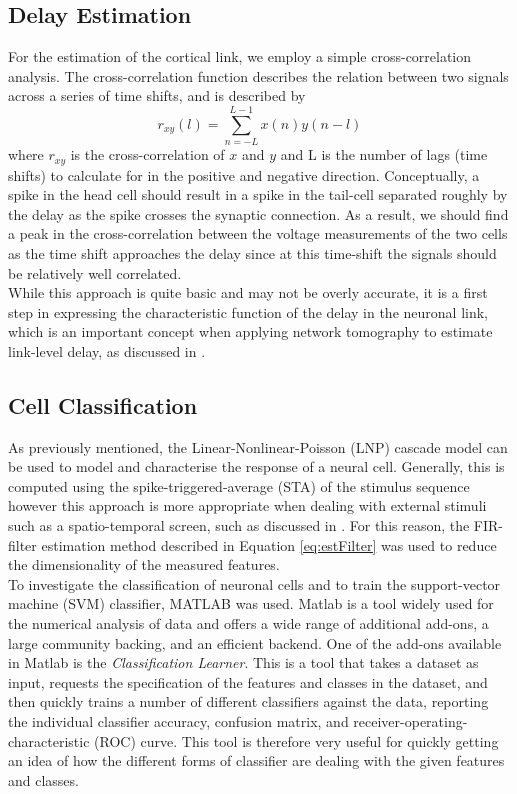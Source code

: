 \documentclass[letterpaper, 10 pt, conference]{ieeeconf}  %
\begin{document}
\subsection{Delay Estimation}
For the estimation of the cortical link, we employ a simple cross-correlation analysis. The cross-correlation function describes the relation between two signals across a series of time shifts, and is described by
\begin{equation}
    \label{eq:xcorr}
    r_{xy}(l) = \sum_{n=-L}^{L-1}x(n)y(n-l)
\end{equation}
where $r_{xy}$ is the cross-correlation of $x$ and $y$ and L is the number of lags (time shifts) to calculate for in the positive and negative direction. Conceptually, a spike in the head cell should result in a spike in the tail-cell separated roughly by the delay as the spike crosses the synaptic connection. As a result, we should find a peak in the cross-correlation between the voltage measurements of the two cells as the time shift approaches the delay since at this time-shift the signals should be relatively well correlated.\\
While this approach is quite basic and may not be overly accurate, it is a first step in expressing the characteristic function of the delay in the neuronal link, which is an important concept when applying network tomography to estimate link-level delay, as discussed in \cite{netTomFour}.\\

\subsection{Cell Classification}
As previously mentioned, the Linear-Nonlinear-Poisson (LNP) cascade model can be used to model and characterise the response of a neural cell. Generally, this is computed using the spike-triggered-average (STA) of the stimulus sequence however this approach is more appropriate when dealing with external stimuli such as a spatio-temporal screen, such as discussed in \cite{lnpInBrain}. For this reason, the FIR-filter estimation method described in Equation \ref{eq:estFilter} was used to reduce the dimensionality of the measured features. \\
To investigate the classification of neuronal cells and to train the support-vector machine (SVM) classifier, MATLAB was used. Matlab is a tool widely used for the numerical analysis of data and offers a wide range of additional add-ons, a large community backing, and an efficient backend. One of the add-ons available in Matlab is the \emph{Classification Learner}. This is a tool that takes a dataset as input, requests the specification of the features and classes in the dataset, and then quickly trains a number of different classifiers against the data, reporting the individual classifier accuracy, confusion matrix, and receiver-operating-characteristic (ROC) curve. This tool is therefore very useful for quickly getting an idea of how the different forms of classifier are dealing with the given features and classes. \\
\end{document}
